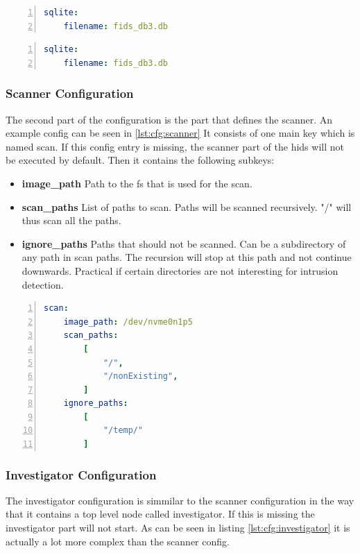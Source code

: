\begin{lstlisting}[language=yaml, numbers=left, caption=SQLite Configuration, label=lst:cfg:sqlite]
sqlite:
	filename: fids_db3.db
\end{lstlisting}


\begin{lstlisting}[language=yaml, numbers=left, caption=Postgres Configuration, label=lst:cfg:postgres]
sqlite:
	filename: fids_db3.db
\end{lstlisting}

\subsubsection{Scanner Configuration}

The second part of the configuration is the part that defines the scanner. An example config can be seen in \ref{lst:cfg:scanner} It consists of one main key which is named scan. If this config entry is missing, the scanner part of the \gls{hids} will not be executed by default. Then it contains the following subkeys:

\begin{itemize}
	\item		\textbf{image\_path} Path to the \gls{fs} that is used for the scan.
	\item		\textbf{scan\_paths} List of paths to scan. Paths will be scanned recursively. "/" will thus scan all the paths.
	\item		\textbf{ignore\_paths} Paths that should not be scanned. Can be a subdirectory of any path in scan paths. The recursion will stop at this path and not continue downwards. Practical if certain directories are not interesting for intrusion detection.
\end{itemize}

\begin{lstlisting}[language=yaml, numbers=left, caption=Scanner Configuration, label=lst:cfg:scanner]
scan:
	image_path: /dev/nvme0n1p5
	scan_paths: 
		[
			"/",
			"/nonExisting",
		]
	ignore_paths: 
		[
			"/temp/"
		]
\end{lstlisting}

\subsubsection{Investigator Configuration}
\label{sec:conf:investigator}

The investigator configuration is simmilar to the scanner configuration in the way that it contains a top level node called investigator. If this is missing the investigator part will not start. As can be seen in listing \ref{lst:cfg:investigator} it is actually a lot more complex than the scanner config. 

